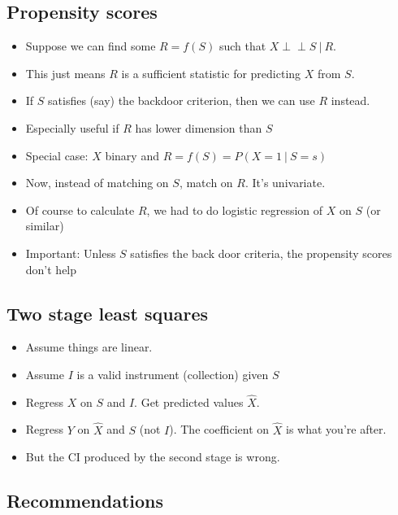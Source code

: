 \documentclass[]{article}
\begin{document}
\hypertarget{propensity-scores}{%
\subsection{Propensity scores}\label{propensity-scores}}

\begin{itemize}
\item
  Suppose we can find some \(R = f(S)\) such that
  \(X \perp\!\!\!\perp S \ \vert\ R\).
\item
  This just means \(R\) is a sufficient statistic for predicting \(X\)
  from \(S\).
\item
  If \(S\) satisfies (say) the backdoor criterion, then we can use \(R\)
  instead.
\item
  Especially useful if \(R\) has lower dimension than \(S\)
\item
  Special case: \(X\) binary and \(R=f(S) = P(X=1 \ \vert\ S=s)\)
\item
  Now, instead of matching on \(S\), match on \(R\). It's univariate.
\item
  Of course to calculate \(R\), we had to do logistic regression of
  \(X\) on \(S\) (or similar)
\item
  Important: Unless \(S\) satisfies the back door criteria, the
  propensity scores don't help
\end{itemize}

\hypertarget{two-stage-least-squares}{%
\subsection{Two stage least squares}\label{two-stage-least-squares}}

\begin{itemize}
\item
  Assume things are linear.
\item
  Assume \(I\) is a valid instrument (collection) given \(S\)
\item
  Regress \(X\) on \(S\) and \(I\). Get predicted values
  \(\widehat{X}\).
\item
  Regress \(Y\) on \(\widehat{X}\) and \(S\) (not \(I\)). The
  coefficient on \(\widehat{X}\) is what you're after.
\item
  But the CI produced by the second stage is wrong.
\end{itemize}

\hypertarget{recommendations}{%
\subsection{Recommendations}\label{recommendations}}
\end{document}
